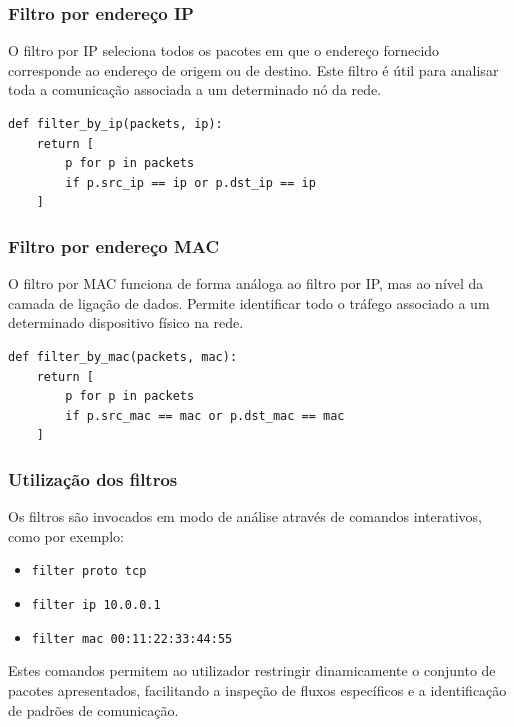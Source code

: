 \documentclass[a4paper,12pt]{article}
\begin{document}
\subsubsection{Filtro por endereço IP}

O filtro por IP seleciona todos os pacotes em que o endereço fornecido corresponde ao endereço de origem ou de destino. Este filtro é útil para analisar toda a comunicação associada a um determinado nó da rede.

\vspace{0.5em}

\begin{lstlisting}[style=python]
def filter_by_ip(packets, ip):
    return [
        p for p in packets
        if p.src_ip == ip or p.dst_ip == ip
    ]
\end{lstlisting}

\subsubsection{Filtro por endereço MAC}

O filtro por MAC funciona de forma análoga ao filtro por IP, mas ao nível da camada de ligação de dados. Permite identificar todo o tráfego associado a um determinado dispositivo físico na rede.

\vspace{0.5em}

\begin{lstlisting}[style=python]
def filter_by_mac(packets, mac):
    return [
        p for p in packets
        if p.src_mac == mac or p.dst_mac == mac
    ]
\end{lstlisting}

\subsubsection{Utilização dos filtros}

Os filtros são invocados em modo de análise através de comandos interativos, como por exemplo:

\begin{itemize}
    \item \texttt{filter proto tcp}
    \item \texttt{filter ip 10.0.0.1}
    \item \texttt{filter mac 00:11:22:33:44:55}
\end{itemize}

Estes comandos permitem ao utilizador restringir dinamicamente o conjunto de pacotes apresentados, facilitando a inspeção de fluxos específicos e a identificação de padrões de comunicação.
\end{document}
